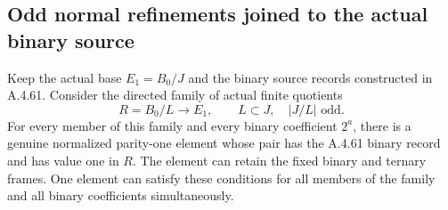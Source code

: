 \subsection{Odd normal refinements joined to the actual binary source}

Keep the actual base $E_1=B_0/J$ and the binary source records
constructed in A.4.61. Consider the directed family of actual finite
quotients
\[
             R=B_0/L\longrightarrow E_1,
             \qquad L\subset J,\quad |J/L|\text{ odd}.
                                                        \tag{OJB.1}
\]
For every member of this family and every binary coefficient
$2^a$, there is a genuine normalized parity-one element whose
pair has the A.4.61 binary record and has value one in $R$.
The element can retain the fixed binary and ternary frames.
One element can satisfy these conditions for all members of
the family and all binary coefficients simultaneously.

